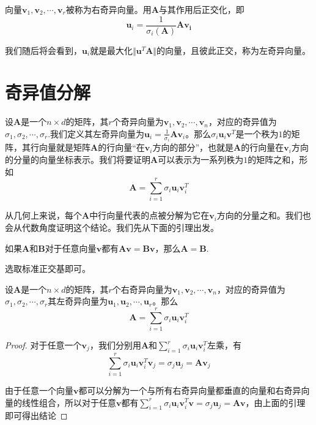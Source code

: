 \documentclass[UTF8]{ctexbook}
\newcommand{\Frobenius}[1]{\Vert #1 \Vert}
\newcommand{\asf}[2]{$#1_1, #1_2, \cdots, #1_#2$}
\begin{document}
	向量$\bm v_1, \bm v_2, \cdots, \bm v_r$被称为右奇异向量。用$\bm A$与其作用后正交化，即
	\begin{equation}
		\bm u_i = \frac{1}{\sigma_i(\bm A)} \bm{Av_i}
	\end{equation}

	我们随后将会看到，$\bm u_i$就是最大化$\Frobenius{\bm u^T \bm A}$的向量，且彼此正交，称为左奇异向量。

\section{奇异值分解}
	设$\bm A$是一个$n \times d$的矩阵，其$r$个奇异向量为$\bm v_1, \bm v_2, \cdots, \bm v_n$，对应的奇异值为\asf{\sigma}{r}.我们定义其左奇异向量为$\bm u_i = \frac{1}{\sigma_i}\bm A \bm v_i$。那么$\sigma_i \bm u_i \bm v^T$是一个秩为$1$的矩阵，其行向量就是矩阵$\bm A$的行向量“在$\bm v_i$方向的部分”，也就是$\bm A$的行向量在$\bm v_i$方向的分量的向量坐标表示。我们将要证明$\bm A$可以表示为一系列秩为$1$的矩阵之和，形如
	\begin{equation}
		\bm A = \sum_{i=1}^r \sigma_i \bm u_i \bm v_i^T
	\end{equation}
	
	从几何上来说，每个$\bm A$中行向量代表的点被分解为它在$\bm v_i$方向的分量之和。我们也会从代数角度证明这个结论。我们先从下面的引理出发。
	\begin{lemma}
		如果$\bm A$和$\bm B$对于任意向量$\bm v$都有$\bm A \bm v = \bm B \bm v$，那么$\bm A = \bm B$.
	\end{lemma}
	\begin{lproof}
		选取标准正交基即可。
	\end{lproof}
	\begin{thm}
		设$\bm A$是一个$n \times d$的矩阵，其$r$个右奇异向量为$\bm v_1, \bm v_2, \cdots, \bm v_n$，对应的奇异值为\asf{\sigma}{r}其左奇异向量为\asf{\bm u}{r}。那么
		\begin{equation}
			\bm A = \sum_{i=1}^r \sigma_i \bm u_i \bm v_i^T
		\end{equation}
	\end{thm}
	\begin{proof}
		对于任意一个$\bm v_j$，我们分别用$\bm A$和$\sum_{i=1}^r \sigma_i \bm u_i \bm v_i^T$左乘，有
		\begin{equation}
			\sum_{i=1}^r \sigma_i \bm u_i \bm v_i^T \bm v_j = \sigma_j \bm u_j = \bm A \bm v_j
		\end{equation}

		由于任意一个向量$\bm v$都可以分解为一个与所有右奇异向量都垂直的向量和右奇异向量的线性组合，所以对于任意$\bm v$都有$\sum_{i=1}^r \sigma_i \bm u_i \bm v_i^T \bm v = \sigma_j \bm u_j = \bm A \bm v$，由上面的引理即可得出结论
	\end{proof}
\end{document}
